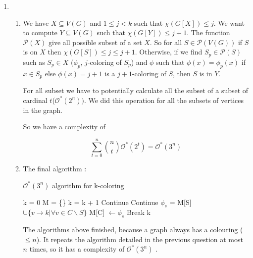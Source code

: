\documentclass{article}
\theoremstyle{plain}
\begin{document}
\begin{enumerate}
    \newpage
    \item
      \begin{enumerate}
        \item We have $X \subseteq V(G)$ and $1 \leq j < k$ such that
          $\chi(G[X]) \leq j$. We want to compute $Y \subseteq V(G)$ such that
          $\chi(G[Y]) \leq j + 1$. The function $\mathcal P(X)$ give all
          possible subset of a set $X$. So for all $S \in \mathcal P (V(G))$
          if $S$ is on $X$ then $\chi(G[S]) \leq j \leq j + 1$. Otherwise,
          if we find $S_p \in \mathcal P(S)$ such as $S_p \in X$ ($\phi_p$,
          $j$-coloring of $S_p$) and $\phi$ such that $\phi(x) = \phi_p(x)$ if
          $x \in S_p$ else $\phi(x) = j + 1$ is a $j+1$-coloring of $S$, then
          $S$ is in $Y$.

          For all subset we have to potentially calculate all the subset of a
          subset of cardinal $t$($\mathcal O^*(2^n))$. We did this operation
          for all the subsets of vertices in the graph.

          So we have a complexity of

          $$\sum_{t=0}^n \binom n t \mathcal O^*(2^t) = \mathcal O^*(3^n)$$

      \item The final algorithm :

        \begin{algorithm}
          \caption{$\mathcal O^*(3^n)$ algorithm for k-coloring}
          \begin{algorithmic}[1]
              \State k = 0
              \State M = \{\}
                \State k = k + 1
                    \State Continue
                  \EndIf
                    \State Continue
                    \EndIf
                    \State $\phi_s$ = M[S] $\cup \{v \to k| \forall v \in C
                      \backslash S\}$
                      \State M[C] $\leftarrow \phi_s$
                      \State Break
                    \EndIf
                  \EndFor
                \EndFor
              \EndWhile
              \State \Return k
            \EndFunction
          \end{algorithmic}
          \end{algorithm}

          The algorithms above finished, because a graph always has a colouring
          ($\leq n$). It repeats the algorithm detailed in the previous question
          at most $n$ times, so it has a complexity of $\mathcal O^*(3^n)$ .
      \end{enumerate}
  \end{enumerate}
\end{document}
